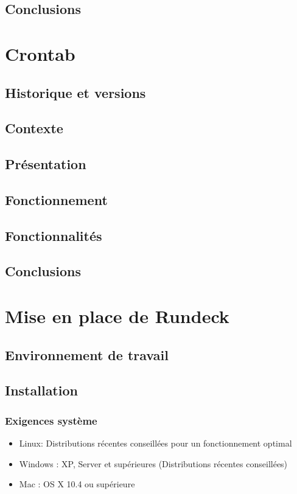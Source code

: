 \documentclass[12pt]{article}
\begin{document}
\subsection{Conclusions}

\section{Crontab}
\subsection{Historique et versions}
\subsection{Contexte}
\subsection{Présentation}
\subsection{Fonctionnement}
\subsection{Fonctionnalités}
\subsection{Conclusions}

\section{Mise en place de Rundeck}
\subsection{Environnement de travail}
\subsection{Installation}
\subsubsection{Exigences système}

\begin{itemize}
    \item Linux: Distributions récentes conseillées pour un fonctionnement optimal
    \item Windows :  XP, Server et supérieures (Distributions récentes conseillées)
    \item Mac : OS X 10.4 ou supérieure
\end{itemize}
\end{document}
